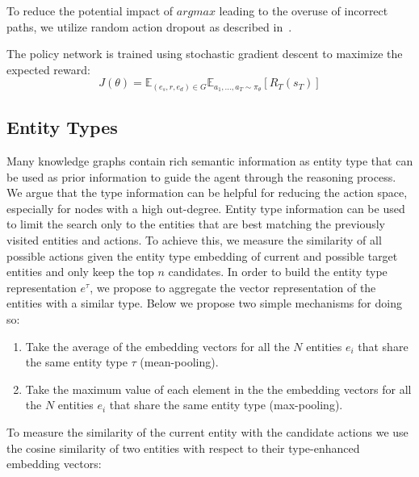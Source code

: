 To reduce the potential impact of $argmax$ leading to the overuse of incorrect paths, we utilize random action dropout as described in~\cite{lin2018multi}.

The policy network is trained using stochastic gradient descent to maximize the expected reward: 
\begin{equation}
    J (\theta) = \mathbb{E}_{(e_s,r,e_d)\in G}\mathbb{E}_{a_1,\dots,a_T \sim\pi_{\theta}} [R_T(s_T)]
\end{equation}

\subsection{Entity Types}
\label{type_embeddings}

Many knowledge graphs contain rich semantic information as entity type that can be used as prior information to guide the agent through the reasoning process. We argue that the type information can be helpful for reducing the action space, especially for nodes with a high out-degree. Entity type information can be used to limit the search only to the entities that are best matching the previously visited entities and actions. To achieve this, we measure the similarity of all possible actions given the entity type embedding of current and possible target entities and only keep the top $n$ candidates.  In order to build the entity type representation $e^{\tau}$, we propose to aggregate the vector representation of the entities with a similar type. Below we propose two simple mechanisms for doing so:

\begin{enumerate}
    \item Take the average of the embedding vectors for all the $N$ entities $e_i$ that share the same entity type $\tau$ (mean-pooling).%
    \item Take the maximum value of each element in the the embedding vectors for all the $N$ entities $e_i$ that share the same entity type (max-pooling).%
\end{enumerate}


To measure the similarity of the current entity with the candidate actions we use the cosine similarity of two entities with respect to their type-enhanced embedding vectors:


